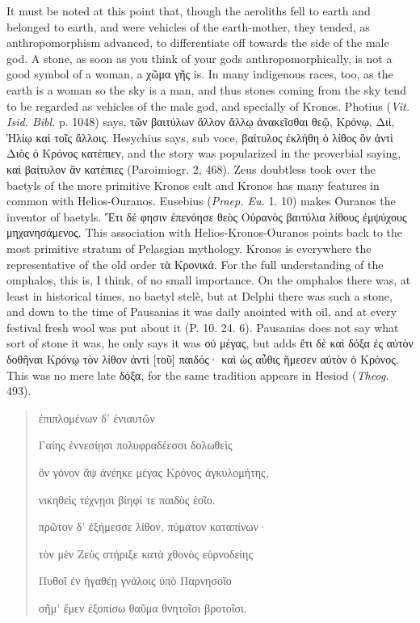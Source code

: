 \documentclass[a4paper, 11pt, oneside, polutonikogreek, english]{article}
\begin{document}
It must be noted at this point that, though the aeroliths fell to earth and belonged to earth, and were vehicles of the earth-mother, they tended, as anthropomorphism advanced, to differentiate off towards the side of the male god. A stone, as soon as you think of your gods anthropomorphically, is not a good symbol of a woman, a χῶμα γῆς is. In many indigenous races, too, as the earth is a woman so the sky is a man, and thus stones coming from the sky tend to be regarded as vehicles of the male god, and specially of Kronos. Photius (\emph{Vit. Isid. Bibl.} p. 1048) says, τῶν βαιτύλων ἄλλον ἄλλῳ ἀνακεῖσθαι θεῷ, Κρόνῳ, Διὶ, Ἡλίῳ καὶ τοῖς ἄλλοις. Hesychius says, sub voce, βαίτυλος ἐκλήθη ὁ λίθος ὃν ἀντὶ Διὸς ὁ Κρόνος κατέπιεν, and the story was popularized in the proverbial saying, καὶ βαίτυλον ἂν κατέπιες (Paroimiogr. 2, 468). Zeus doubtless took over the baetyls of the more primitive Kronos cult and Kronos has many features in common with Helios-Ouranos. Eusebius (\emph{Praep. Eu.} 1. 10) makes Ouranos the inventor of baetyls. Ἔτι δέ φησιν ἐπενόησε θεὸς Οὐρανὸς βαιτύλια λίθους ἐμψύχους μηχανησάμενος. This association with Helios-Kronos-Ouranos points back to the most primitive stratum of Pelasgian mythology. Kronos is everywhere the representative of the old order τὰ Κρονικά. For the full understanding of the omphalos, this is, I think, of no small importance. On the omphalos there was, at least in historical times, no baetyl stelè, but at Delphi there was such a stone, and down to the time of Pausanias it was daily anointed with oil, and at every festival fresh wool was put about it (P. 10. 24. 6). Pausanias does not say what sort of stone it was, he only says it was οὐ μέγας, but adds ἔτι δὲ καὶ δόξα ἐς αὐτὸν δοθῆναι Κρόνῳ τὸν λίθον ἀντὶ [τοῦ] παιδός· καὶ ὡς αὖθις ἥμεσεν αὐτὸν ὁ Κρόνος. This was no mere late δόξα, for the same tradition appears in Hesiod (\emph{Theog.} 493).
\begin{quotation}
\hspace*{15mm}ἐπιπλομένων δ' ἐνιαυτῶν

Γαίης ἐννεσίῃσι πολυφραδέεσσι δολωθεὶς

ὃν γόνον ἂψ ἀνέηκε μέγας Κρόνος ἀγκυλομήτης,

νικηθεὶς τέχνῃσι βίηφί τε παιδὸς ἑοῖο.

πρῶτον δ' ἐξήμεσσε λίθον, πύματον καταπίνων·

τὸν μὲν Ζεὺς στήριξε κατὰ χθονὸς εὐρνοδείης

Πυθοῖ ἐν ἠγαθέῃ γνάλοις ὑπὸ Παρνησοῖο

σῆμ' ἔμεν ἐξοπίσω θαῦμα θνητοῖσι βροτοῖσι.
\end{quotation}
\end{document}
